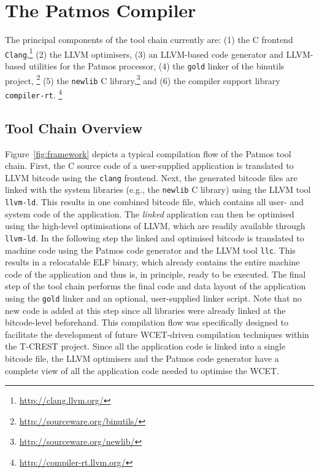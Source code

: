 \chapter{The Patmos Compiler}
\label{sec:the_patmos_compiler}

The principal components of the tool chain currently are:
(1) the C frontend \texttt{Clang},\footnote{\url{http://clang.llvm.org/}} (2)
the LLVM optimisers, (3) an LLVM-based code generator and LLVM-based utilities
for the Patmos processor, (4) the \texttt{gold} linker of the binutils project,%
\footnote{\url{http://sourceware.org/binutils/}} (5) the \texttt{newlib} C
library,\footnote{\url{http://sourceware.org/newlib/}} and (6) the compiler
support library \texttt{compiler-rt}.%
\footnote{\url{http://compiler-rt.llvm.org/}}

\section{Tool Chain Overview}
\label{sec:toolchain_overview}

Figure~\ref{fig:framework} depicts a typical compilation flow of the Patmos
tool chain. First, the C source code of a user-supplied application is
translated to LLVM bitcode using the \texttt{clang} frontend. Next, the
generated bitcode files are linked with the system libraries (e.g., the 
\texttt{newlib} C library) using the LLVM tool \texttt{llvm-ld}. This results in
one combined bitcode file, which contains all user- and system code of the
application. The \emph{linked} application can then be optimised using the
high-level optimisations of LLVM, which are readily available through
\texttt{llvm-ld}. In the following step the linked and optimised bitcode is
translated to machine code using the Patmos code generator and the LLVM tool
\texttt{llc}. This results in a relocatable ELF binary, which already contains
the entire machine code of the application and thus is, in principle, ready to
be executed. The final step of the tool chain performs the final code and data
layout of the application using the \texttt{gold} linker and an optional,
user-supplied linker script. Note that no new code is added at this step since
all libraries were already linked at the bitcode-level beforehand. This
compilation flow was specifically designed to facilitate the development of
future WCET-driven compilation techniques within the T-CREST project. Since all
the application code is linked into a single bitcode file, the LLVM optimisers
and the Patmos code generator have a complete view of all the application code
needed to optimise the WCET.

